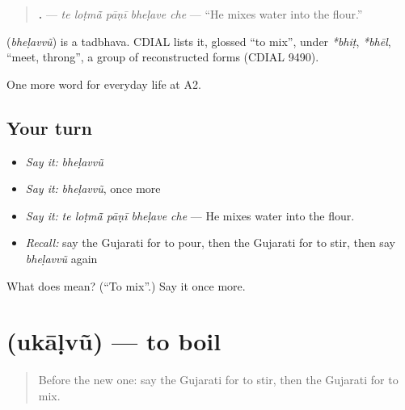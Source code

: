 \begin{quote}
\textbf{    .} — \emph{te loṭmā̃ pāṇī bheḷave che} — \textquotedblleft{}He mixes water into the flour.\textquotedblright{}
\end{quote}

\begin{cousinweb}
\textbf{} (\emph{bheḷavvũ}) is a tadbhava. CDIAL lists it, glossed \textquotedblleft{}to mix\textquotedblright{}, under \emph{*bhiṭ}, \emph{*bhēl}, \textquotedblleft{}meet, throng\textquotedblright{}, a group of reconstructed forms (CDIAL 9490).
\end{cousinweb}

\begin{grammarlens}[title={What you've built}]
One more word for everyday life at A2.
\end{grammarlens}

\subsection*{Your turn}
\begin{itemize}
\raggedright
  \item \emph{Say it:} \emph{bheḷavvũ}
  \item \emph{Say it:} \emph{bheḷavvũ}, once more
  \item \emph{Say it:} \emph{te loṭmā̃ pāṇī bheḷave che} — He mixes water into the flour.
  \item \emph{Recall:} say the Gujarati for to pour, then the Gujarati for to stir, then say \emph{bheḷavvũ} again
\end{itemize}

\begin{tcolorbox}[breakable,colback=teal!4,colframe=teal!35!black,title={Before you move on}]
What does  mean? (\textquotedblleft{}To mix\textquotedblright{}.) Say it once more.
\end{tcolorbox}
\section[\texorpdfstring{\gu{ઉકાળવું} (ukāḷvũ)}{ઉકાળવું (ukāḷvũ)}]{ (ukāḷvũ) — to boil}

\label{lesson:GU-C165-ukalvu}



\begin{quote}
Before the new one: say the Gujarati for to stir, then the Gujarati for to mix.
\end{quote}

